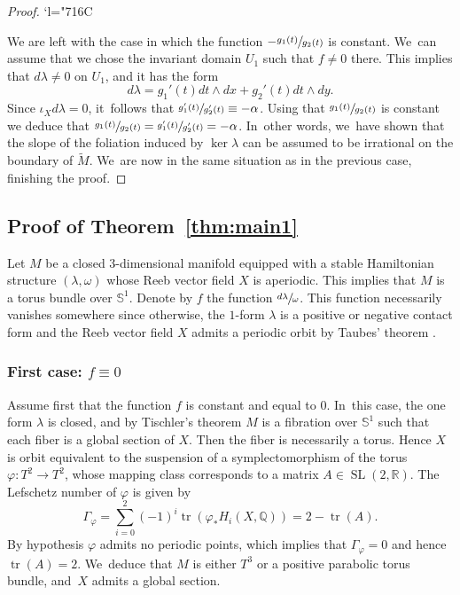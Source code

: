 \documentclass[11pt]{article}
\newcommand{\Changelback}{\mathcode`l="716C}
\DeclareMathOperator{\SL}{SL}
\theoremstyle{definition}
\newcommand{\mS}{\mathbb{S}}
\begin{document}
\begin{proof}
\Changelback

We are left with the case in which the function $-\sfrac{g_1(t)}{g_2(t)}$ is constant. We~can assume that we chose the invariant domain $U_1$ such that $f\neq 0$ there. This implies that $d\lambda \neq 0$ on $U_1$, and it has the form
\[
d\lambda= g_1'(t) dt\wedge dx + g_2'(t) dt\wedge dy.
\]
Since $\iota_Xd\lambda=0$, it~follows that $\sfrac{g_1'(t)}{g_2'(t)}\equiv -\alpha$. Using that $\sfrac{g_1(t)}{g_2(t)}$ is constant we deduce that $\sfrac{g_1(t)}{g_2(t)}=\sfrac{g_1'(t)}{g_2'(t)}=-{\alpha}$. In~other words, we~have shown that the slope of the foliation induced by $\ker \lambda$ can be assumed to be irrational on the boundary of $\widetilde M$. We~are now in the same situation as in the previous case, finishing the proof.
\end{proof}

\subsection{Proof of Theorem~\ref{thm:main1}}\label{ss:Tisch}

Let $M$ be a closed 3-dimensional manifold equipped with a stable Hamiltonian structure $(\lambda, \omega)$ whose Reeb vector field $X$ is aperiodic. This implies that $M$ is a torus bundle over $\mS^1$. Denote by $f$ the function $\sfrac{d\lambda}{\omega}$. This function necessarily vanishes somewhere since otherwise, the $1$-form $\lambda$ is a positive or negative contact form and the Reeb vector field $X$ admits a periodic orbit by Taubes' theorem
\cite{Taub}.

\subsubsection*{First case: $f\equiv 0$}
Assume first that the function $f$ is constant and equal to $0$. In~this case, the one form $\lambda$ is closed, and by Tischler's theorem \cite{Tis} $M$ is a fibration over $\mS^1$ such that each fiber is a global section of $X$. Then the fiber is necessarily a torus. Hence $X$ is orbit equivalent to the suspension of a symplectomorphism of the torus $\varphi:T^2\to T^2$, whose mapping class corresponds to a matrix $A\in \SL(2,\mathbb{R})$.
The Lefschetz number of $\varphi$ is given by
\begin{equation*}
\Gamma_{\varphi}=\sum_{i=0}^2 (-1)^i\operatorname{tr}(\varphi_*H_i(X,\mathbb{Q}))
								=2- \operatorname{tr}(A).
\end{equation*}
By hypothesis $\varphi$ admits no periodic points, which implies that $\Gamma_{\varphi}=0$ and hence $\operatorname{tr}(A)=2$. We~deduce that $M$ is either $T^3$ or a positive parabolic torus bundle, and~$X$ admits a global section.
\end{document}
